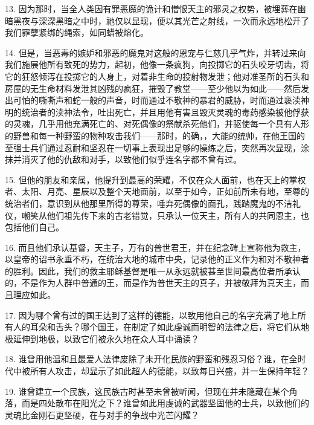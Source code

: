 13. 因为那时，当全人类因有罪恶魔的诡计和憎恨天主的邪灵之权势，被埋葬在幽暗黑夜与深深黑暗之中时，祂仅以显现，便以其光芒之射线，一次而永远地松开了我们罪孽紧绑的绳索，如同蜡被熔化。\par

14. 但是，当恶毒的嫉妒和邪恶的魔鬼对这般的恩宠与仁慈几乎气炸，并转过来向我们施展他所有致死的势力，起初，他像一条疯狗，向投掷它的石头咬牙切齿，将它的狂怒倾泻在投掷它的人身上，对着非生命的投射物发泄；他对准圣所的石头和房屋的无生命材料发泄其凶残的疯狂，摧毁了教堂——至少他以为如此——然后发出可怕的嘶嘶声和蛇一般的声音，时而通过不敬神的暴君的威胁，时而通过亵渎神明的统治者的渎神法令，吐出死亡，并且用他有害且毁灭灵魂的毒药感染被他俘获的灵魂，几乎用他充满死亡的、对死偶像的祭献杀死他们，并驱使每一个具有人形的野兽和每一种野蛮的物种攻击我们——那时，的确，，大能的统帅，在他王国的至强士兵们通过忍耐和坚忍在一切事上表现出足够的操练之后，突然再次显现，涂抹并消灭了他的仇敌和对手，以致他们似乎连名字都不曾有过。\par

15. 但他的朋友和亲属，他提升到最高的荣耀，不仅在众人面前，也在天上的掌权者、太阳、月亮、星辰以及整个天地面前，以至于如今，正如前所未有地，至尊的统治者们，意识到从他那里所得的尊荣，唾弃死偶像的面孔，践踏魔鬼的不洁礼仪，嘲笑从他们祖先传下来的古老错觉，只承认一位天主，所有人的共同恩主，也包括他们自己。\par

16. 而且他们承认基督，天主子，万有的普世君王，并在纪念碑上宣称他为救主，以皇帝的诏书永垂不朽，在统治大地的城市中央，记录他的正义作为和对不敬神者的胜利。因此，我们的救主耶稣基督是唯一从永远就被甚至世间最高位者所承认的，不是作为人群中普通的王，而是作为普世天主的真子，并被敬拜为真天主，而且理应如此。\par

17. 因为哪个曾有过的国王达到了这样的德能，以致用他自己的名字充满了地上所有人的耳朵和舌头？哪个国王，在制定了如此虔诚而明智的法律之后，将它们从地极延伸到地极，以致它们被永久地在众人耳中诵读？\par

18. 谁曾用他温和且最爱人法律废除了未开化民族的野蛮和残忍习俗？谁，在全时代中被所有人攻击，却显示了如此超人的德能，以致每日兴盛，并一生保持年轻？\par

19. 谁曾建立一个民族，这民族古时甚至未曾被听闻，但现在并未隐藏在某个角落，而是四处散布在阳光之下？谁曾如此用虔诚的武器坚固他的士兵，以致他们的灵魂比金刚石更坚硬，在与对手的争战中光芒闪耀？\par

